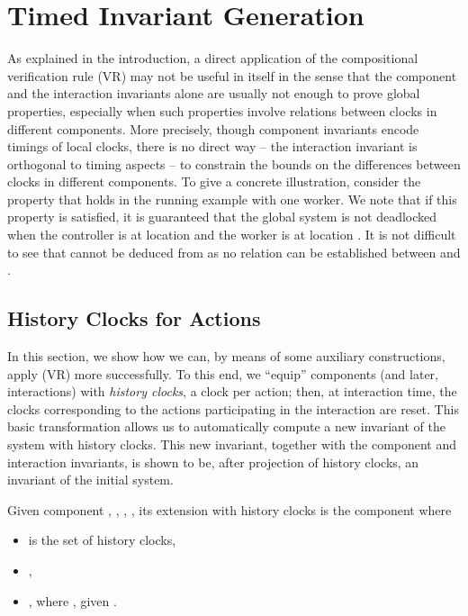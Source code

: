 \documentclass{LMCS}
\theoremstyle{plain}\newtheorem{remark}[thm]{Remark}
\theoremstyle{plain}\newtheorem{example}[thm]{Example}
\begin{document}
\section{Timed Invariant Generation}
\label{s:bm}

As explained in the introduction, a direct application of the
compositional verification rule (VR) may not be useful in itself in
the sense that the component and the interaction invariants alone are
usually not enough to prove global properties, especially when such
properties involve relations between clocks in different
components. More precisely, though component invariants encode timings
of local clocks, there is no direct way -- the interaction invariant
is orthogonal to timing aspects -- to constrain the bounds on the
differences between clocks in different components. To give a concrete
illustration, consider the property  that holds in the running
example with one worker. We note that if this property is satisfied,
it is guaranteed that the global system is not deadlocked when the
controller is at location  and the worker is at location
.  It is not difficult to see that 
cannot be deduced from  as no relation can be
established between  and .

\subsection{History Clocks for Actions}

In this section, we show how we can, by means of some auxiliary
constructions, apply (VR) more successfully. To this end, we ``equip''
components (and later, interactions) with \textit{history clocks}, a
clock per action; then, at interaction time, the clocks corresponding
to the actions participating in the interaction are reset. This basic
transformation allows us to automatically compute a new invariant of
the system with history clocks. This new invariant, together with the
component and interaction invariants, is shown to be, after projection
of history clocks, an invariant of the initial system.

\begin{defi} Given component , , , , its extension with history clocks is the component  where
\begin{itemize}
\item  is the set of history
  clocks,
\item ,
\item , where , given .
\end{itemize}
\label{def:cha}
\end{defi}
\end{document}
